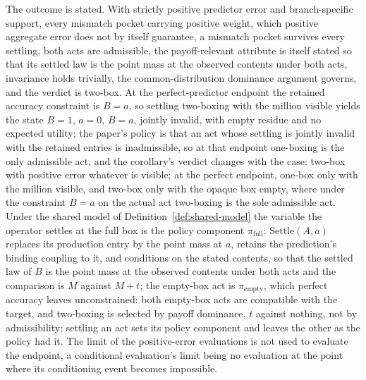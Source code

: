 \begin{corollary} \label{cor:transparent-sort} The outcome is stated. With strictly positive predictor error and branch-specific support, every mismatch pocket carrying positive weight, which positive aggregate error does not by itself guarantee, a mismatch pocket survives every settling, both acts are admissible, the payoff-relevant attribute is itself stated so that its settled law is the point mass at the observed contents under both acts, invariance holds trivially, the common-distribution dominance argument governs, and the verdict is two-box. At the perfect-predictor endpoint the retained accuracy constraint is $B = a$, so settling two-boxing with the million visible yields the state $B = 1$, $a = 0$, $B = a$, jointly invalid, with empty residue and no expected utility; the paper's policy is that an act whose settling is jointly invalid with the retained entries is inadmissible, so at that endpoint one-boxing is the only admissible act, and the corollary's verdict changes with the case: two-box with positive error whatever is visible; at the perfect endpoint, one-box only with the million visible, and two-box only with the opaque box empty, where under the constraint $B = a$ on the actual act two-boxing is the sole admissible act. Under the shared model of Definition~\ref{def:shared-model} the variable the operator settles at the full box is the policy component $\pi_{\mathrm{full}}$: $\mathrm{Settle}(A, a)$ replaces its production entry by the point mass at $a$, retains the prediction's binding coupling to it, and conditions on the stated contents, so that the settled law of $B$ is the point mass at the observed contents under both acts and the comparison is $M$ against $M + t$; the empty-box act is $\pi_{\mathrm{empty}}$, which perfect accuracy leaves unconstrained: both empty-box acts are compatible with the target, and two-boxing is selected by payoff dominance, $t$ against nothing, not by admissibility; settling an act sets its policy component and leaves the other as the policy had it. The limit of the positive-error evaluations is not used to evaluate the endpoint, a conditional evaluation's limit being no evaluation at the point where its conditioning event becomes impossible. \end{corollary}

